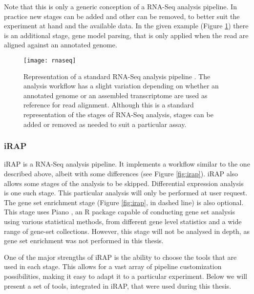 Note that this is only a generic conception of a RNA-Seq analysis pipeline. In
practice new stages can be added and other can be removed, to better suit the
experiment at hand and the available data. In the given example (Figure
\ref{fig:rnaseq}) there is an additional stage, gene model parsing, that is only
applied when the read are aligned against an annotated genome.

\begin{figure}[!htb]
  \begin{center}
    \leavevmode
    \texttt{[image: rnaseq]}
    \caption[Representation of a standard RNA-Seq analysis pipeline]{
      Representation of a standard RNA-Seq analysis pipeline
      \cite{rnaseqpipeline}. The analysis workflow has a slight variation
      depending on whether an annotated genome or an assembled transcriptome are
      used as reference for read alignment. Although this is a standard
      representation of the stages of RNA-Seq analysis, stages can be added or
      removed as needed to suit a particular assay.
    }
    \label{fig:rnaseq}
  \end{center}
\end{figure}


\subsubsection*{iRAP}

iRAP is a RNA-Seq analysis pipeline. It implements a workflow similar to the one
described above, albeit with some differences (see Figure \ref{fig:irap}). iRAP
also allows some stages of the analysis to be skipped. Differential expression
analysis is one such stage. This particular analysis will only be performed at
user request. The gene set enrichment stage (Figure \ref{fig:irap}, in dashed
line) is also optional. This stage uses Piano \cite{varemo01042013}, an R
package capable of conducting gene set analysis using various statistical
methods, from different gene level statistics and a wide range of gene-set
collections. However, this stage will not be analysed in depth, as gene set
enrichment was not performed in this thesis.

One of the major strengths of iRAP is the ability to choose the tools that are
used in each stage. This allows for a vast array of pipeline customization
possibilities, making it easy to adapt it to a particular experiment. Below we
will present a set of tools, integrated in iRAP, that were used during this
thesis.

